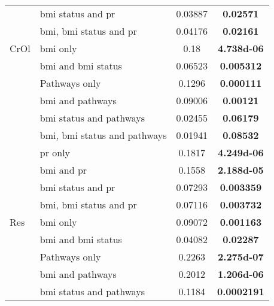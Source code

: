 \begin{ThreePartTable}
\begin{longtable}{llcc}
		                                  & \gls{bmi} status and \gls{pr}            & 0.03887    & \bfseries 0.02571   \\
		                                  & \gls{bmi}, \gls{bmi} status and \gls{pr} & 0.04176    & \bfseries 0.02161   \\
				\hline
				\rule{0pt}{2.25ex}CrOl    & \gls{bmi} only                           & 0.18       & \bfseries \num{4.738d-06} \\
		                                  & \gls{bmi} and \gls{bmi} status           & 0.06523    & \bfseries 0.005312  \\
		                                  & Pathways only                            & 0.1296     & \bfseries 0.000111  \\
		                                  & \gls{bmi} and pathways                   & 0.09006    & \bfseries 0.00121   \\
		                                  & \gls{bmi} status and pathways            & 0.02455    & \bfseries 0.06179   \\
		                                  & \gls{bmi}, \gls{bmi} status and pathways & 0.01941    & \bfseries 0.08532   \\
		                                  & \gls{pr} only                            & 0.1817     & \bfseries \num{4.249d-06} \\
		                                  & \gls{bmi} and \gls{pr}                   & 0.1558     & \bfseries \num{2.188d-05} \\
		                                  & \gls{bmi} status and \gls{pr}            & 0.07293    & \bfseries 0.003359  \\
		                                  & \gls{bmi}, \gls{bmi} status and \gls{pr} & 0.07116    & \bfseries 0.003732  \\
				\hline
				\rule{0pt}{2.25ex}Res     & \gls{bmi} only                           & 0.09072    & \bfseries 0.001163  \\
		                                  & \gls{bmi} and \gls{bmi} status           & 0.04082    & \bfseries 0.02287   \\
		                                  & Pathways only                            & 0.2263     & \bfseries \num{2.275d-07} \\
		                                  & \gls{bmi} and pathways                   & 0.2012     & \bfseries \num{1.206d-06} \\
		                                  & \gls{bmi} status and pathways            & 0.1184     & \bfseries 0.0002191 \\

\end{longtable}
\end{ThreePartTable}
